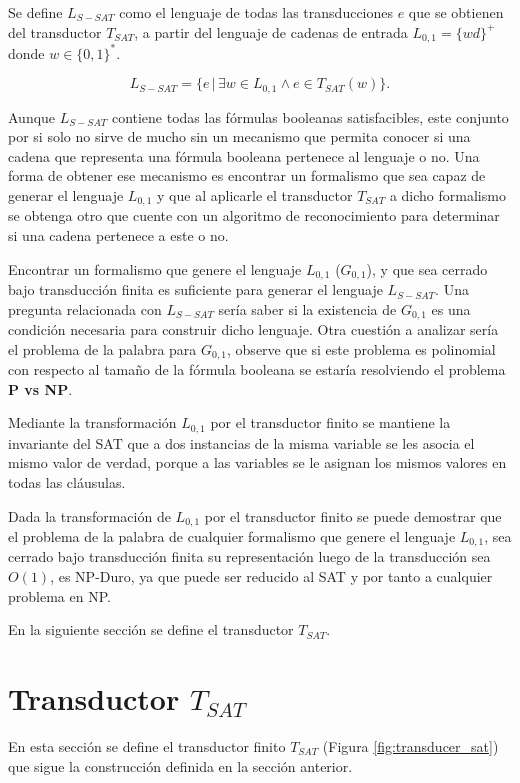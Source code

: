 \documentclass[12pt]{article}
\begin{document}
Se define $L_{S-SAT}$ como el lenguaje de todas las transducciones $e$ que se obtienen del transductor $T_{SAT}$, a partir del lenguaje de cadenas de entrada $L_{0,1}=\{wd\}^+$ donde $w\in \{0,1\}^*$.

$$L_{S-SAT} = \{e\,|\,\exists w \in L_{0,1} \wedge e \in T_{SAT}(w) \}.$$

Aunque $L_{S-SAT}$ contiene todas las fórmulas booleanas satisfacibles, este conjunto por si solo no sirve de 
mucho sin un mecanismo que permita conocer si una cadena que representa una fórmula booleana pertenece al 
lenguaje o no. Una forma de obtener ese mecanismo es encontrar un formalismo que sea capaz de generar el 
lenguaje $L_{0,1}$ y que al aplicarle el transductor $T_{SAT}$ a dicho formalismo se obtenga otro que 
cuente con un algoritmo de reconocimiento para determinar si una cadena pertenece a este o no.

Encontrar un formalismo que genere el lenguaje $L_{0,1}$ ($G_{0,1}$), y que sea cerrado bajo transducción finita es 
suficiente para generar el lenguaje $L_{S-SAT}$. Una pregunta relacionada con $L_{S-SAT}$ sería saber si la 
existencia de $G_{0,1}$ es una condición necesaria para construir dicho lenguaje.  Otra cuestión a analizar
sería el problema de la palabra para $G_{0,1}$, observe que si este problema es polinomial con respecto al tamaño
de la fórmula booleana se estaría resolviendo el problema \textbf{P vs NP}.

Mediante la transformación $L_{0,1}$ por el transductor finito se mantiene la invariante del SAT que a dos 
instancias de la misma variable se les asocia el mismo valor de verdad, porque a las variables se
le asignan los mismos valores en todas las cláusulas.

Dada la transformación de $L_{0,1}$ por el transductor finito se puede demostrar que el problema de la 
palabra de cualquier formalismo que genere el lenguaje $L_{0,1}$, sea cerrado bajo transducción finita 
su representación luego de la transducción sea $O(1)$, es NP-Duro, ya que puede ser reducido al SAT y por tanto a cualquier problema en NP. 

En la siguiente sección se define el transductor $T_{SAT}$.

\section{Transductor $T_{SAT}$}

En esta sección se define el transductor finito $T_{SAT}$ (Figura \ref{fig:transducer_sat}) que sigue la construcción definida en la sección anterior.
\end{document}
